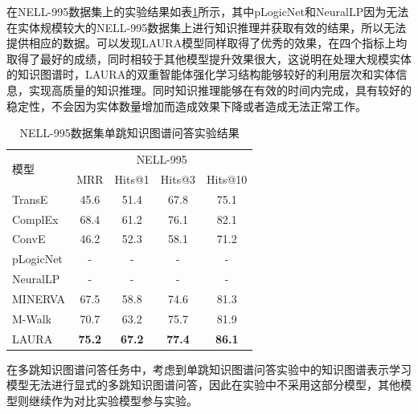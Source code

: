 \documentclass[algorithmlist, AutoFakeBold, AutoFakeSlant, figurelist, tablelist, nomlist, engineering]{seuthesix}
\begin{document}
在NELL-995数据集上的实验结果如表\ref{Experiment2_NELL-995}所示，其中pLogicNet和NeuralLP因为无法在实体规模较大的NELL-995数据集上进行知识推理并获取有效的结果，所以无法提供相应的数据。可以发现LAURA模型同样取得了优秀的效果，在四个指标上均取得了最好的成绩，同时相较于其他模型提升效果很大，这说明在处理大规模实体的知识图谱时，LAURA的双重智能体强化学习结构能够较好的利用层次和实体信息，实现高质量的知识推理。同时知识推理能够在有效的时间内完成，具有较好的稳定性，不会因为实体数量增加而造成效果下降或者造成无法正常工作。
\begin{table}[]
  \centering
  \begin{tabular*}{0.95\textwidth}{@{\extracolsep{\fill}}lcccc}
  \toprule[1pt]
  \multirow{2}{*}{模型} & \multicolumn{4}{c}{NELL-995} \\
    & MRR & Hits@1 & Hits@3 & Hits@10 \\ \hline
  TransE & 45.6 & 51.4 & 67.8 & 75.1 \\
  ComplEx & 68.4 & 61.2 & 76.1 & 82.1 \\
  ConvE & 46.2 & 52.3 & 58.1 & 71.2 \\
  pLogicNet & - & - & - & - \\
  NeuralLP & - & - & - & - \\
  MINERVA & 67.5 & 58.8 & 74.6 & 81.3 \\
  M-Walk & 70.7 & 63.2 & 75.7 & 81.9 \\
  LAURA & \textbf{75.2} & \textbf{67.2} & \textbf{77.4} & \textbf{86.1} \\
  \bottomrule[1pt]
  \end{tabular*}
  \caption{NELL-995数据集单跳知识图谱问答实验结果}
  \label{Experiment2_NELL-995}
\end{table}

在多跳知识图谱问答任务中，考虑到单跳知识图谱问答实验中的知识图谱表示学习模型无法进行显式的多跳知识图谱问答，因此在实验中不采用这部分模型，其他模型则继续作为对比实验模型参与实验。
\end{document}
